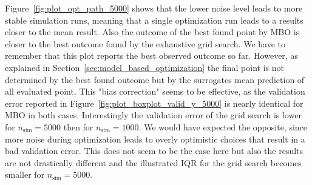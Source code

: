 \documentclass[bimj,fleqn]{w-art}
\theoremstyle{plain}
\theoremstyle{definition}
\begin{document}
Figure~\ref{fig:plot_opt_path_5000} shows that the lower noise level leads to more stable simulation runs, meaning that a single optimization run leads to a results closer to the mean result.
Also the outcome of the best found point by MBO is closer to the best outcome found by the exhaustive grid search.
We have to remember that this plot reports the best observed outcome so far. 
However, as explained in Section~\ref{sec:model_based_optimization} the final point is not determined by the best found outcome but by the surrogates mean prediction of all evaluated point.
This "bias correction" seems to be effective, as the validation error reported in Figure~\ref{fig:plot_boxplot_valid_y_5000} is nearly identical for MBO in both cases.
Interestingly the validation error of the grid search is lower for $n_\text{sim} = 5000$ then for $n_\text{sim} = 1000$.
We would have expected the opposite, since more noise during optimization leads to overly optimistic choices that result in a bad validation error.
This does not seem to be the case here but also the results are not drastically different and the illustrated IQR for the grid search becomes smaller for $n_\text{sim} = 5000$.
\end{document}

